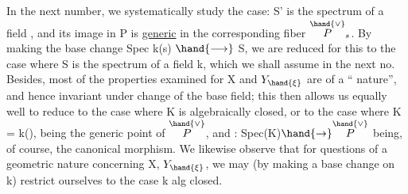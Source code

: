 In the next number, we systematically study the
 case: S' is the spectrum of a field , and its image in P is \uline{generic}
in the corresponding fiber $\overset{\hand{\vee}}{P}_s$. By making the base change
Spec k(s) $\hand{\longrightarrow}$ S, we are reduced for this to the case where S is the spectrum
of a field k, which we shall assume in the next no. Besides, most
of the properties examined for X and $Y_{\hand{\xi}}$ are of a `` nature'',
and hence invariant under change of the base field; this then allows us
equally well to reduce to the case where K is algebraically closed, or to the
case where K = k(\hand{$\eta$}), \hand{$\eta$} being the generic point of $\overset{\hand{\vee}}{P}$, and \hand{$\xi$}: Spec(K)$\hand{\to}\overset{\hand{\vee}}{P}$
being, of course, the canonical morphism. We likewise observe that for
questions of a geometric nature concerning X, $Y_{\hand{\xi}}$, we may (by making
a base change on k) restrict ourselves to the case k alg closed.

